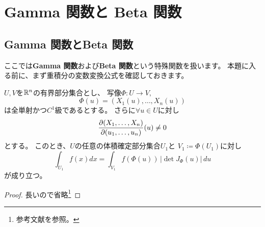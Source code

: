 \documentclass[report]{jlreq}
\begin{document}
\chapter{Gamma 関数と Beta 関数}

%
\section{Gamma 関数とBeta 関数}

ここでは\textbf{Gamma 関数}および\textbf{Beta 関数}という特殊関数を扱います。
本題に入る前に、まず重積分の変数変換公式を確認しておきます。

\begin{theorem}[変数変換公式]
    $U, V$を$\mathbb{R}^n$の有界部分集合とし、
    写像$\Phi \colon U \to V,$
    \begin{equation}
        \Phi(u) = (X_1(u), \dots, X_n(u))
    \end{equation}
    は全単射かつ$C^1$級であるとする。
    さらに$\forall u \in U$に対し
    \begin{equation}
        \deldel[(X_1, \dots, X_n)]{(u_1, \dots, u_n)}(u) \neq 0
    \end{equation}
    とする。
    このとき、$U$の任意の体積確定部分集合$U_1$と
    $V_1 \coloneqq \Phi(U_1)$に対し
    \begin{equation}
        \int_{U_1} f(x) dx = \int_{V_1} f(\Phi(u))\, |\det J_\Phi(u)|\, du
    \end{equation}
    が成り立つ。
\end{theorem}

\begin{proof}
    長いので省略\footnote{
        参考文献\cite[第VII章 \S{4}]{杉浦85}を参照。
    }
\end{proof}
\end{document}
